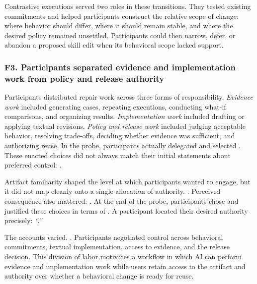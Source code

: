 Contrastive executions served two roles in these transitions. They tested
existing commitments and helped participants construct the relative scope of
change: where behavior should differ, where it should remain stable, and where
the desired policy remained unsettled. Participants could then narrow, defer,
or abandon a proposed skill edit when its behavioral scope lacked support.

\subsubsection{F3. Participants separated evidence and implementation work from policy and release authority}
\label{sec:f3-delegation}

Participants distributed repair work across three forms of responsibility.
\emph{Evidence work} included generating cases, repeating executions,
conducting what-if comparisons, and organizing results. \emph{Implementation
work} included drafting or applying textual revisions. \emph{Policy and release
work} included judging acceptable behavior, resolving trade-offs, deciding
whether evidence was sufficient, and authorizing reuse. In the probe,
participants actually delegated 
and selected . These enacted choices did
not always match their initial statements about preferred control:
.

Artifact familiarity shaped the level at which participants wanted to engage,
but it did not map cleanly onto a single allocation of authority.
. Perceived consequence also mattered: . At the end of the probe, participants chose
and justified these choices in terms of . A participant located their desired authority precisely:
\emph{``.''}

The accounts varied. . Participants negotiated control
across behavioral commitments, textual implementation, access to evidence, and
the release decision. This division of labor motivates a workflow in which AI
can perform evidence and implementation work while users retain access to the
artifact and authority over whether a behavioral change is ready for reuse.

